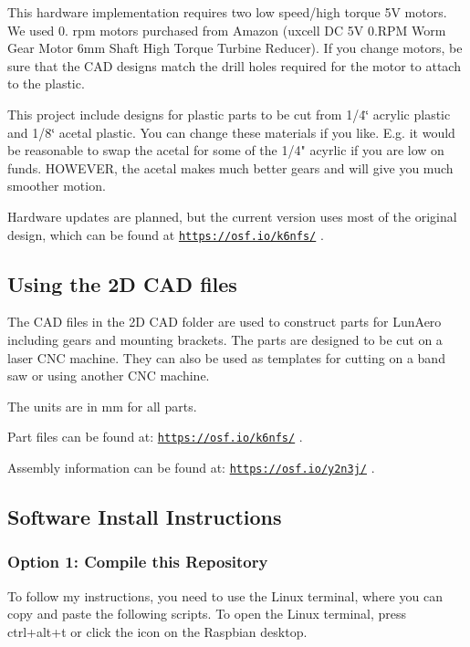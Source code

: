 This hardware implementation requires two low speed/high torque 5V motors. We used 0. rpm motors purchased from Amazon (uxcell DC 5V 0.\+R\+PM Worm Gear Motor 6mm Shaft High Torque Turbine Reducer). If you change motors, be sure that the C\+AD designs match the drill holes required for the motor to attach to the plastic.

This project include designs for plastic parts to be cut from 1/4\char`\"{}
acrylic plastic and 1/8\char`\"{} acetal plastic. You can change these materials if you like. E.\+g. it would be reasonable to swap the acetal for some of the 1/4" acyrlic if you are low on funds. H\+O\+W\+E\+V\+ER, the acetal makes much better gears and will give you much smoother motion.

Hardware updates are planned, but the current version uses most of the original design, which can be found at \href{https://osf.io/k6nfs/}{\tt https\+://osf.\+io/k6nfs/} .

\subsection*{Using the 2D C\+AD files}

The C\+AD files in the 2D C\+AD folder are used to construct parts for Lun\+Aero including gears and mounting brackets. The parts are designed to be cut on a laser C\+NC machine. They can also be used as templates for cutting on a band saw or using another C\+NC machine.

The units are in mm for all parts.

Part files can be found at\+: \href{https://osf.io/k6nfs/}{\tt https\+://osf.\+io/k6nfs/} .

Assembly information can be found at\+: \href{https://osf.io/y2n3j/}{\tt https\+://osf.\+io/y2n3j/} .

\subsection*{Software Install Instructions}

\subsubsection*{Option 1\+: Compile this Repository}

To follow my instructions, you need to use the Linux terminal, where you can copy and paste the following scripts. To open the Linux terminal, press {\ttfamily ctrl}+{\ttfamily alt}+{\ttfamily t} or click the icon on the Raspbian desktop.

